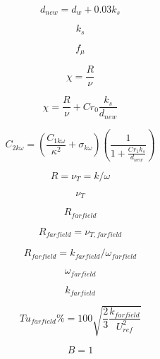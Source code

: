 \begin{equation}
d_{new}=d_{w}+0.03k_{s}
\end{equation}

\begin{equation}
k_s
\end{equation}

\begin{equation}
f_{\mu}
\end{equation}

\begin{equation}
\chi =\frac{R}{\nu }
\end{equation}

\begin{equation}
\chi =\frac{R}{\nu} +Cr_{0}\frac{k_{s}}{d_{new}}
\end{equation}

\begin{equation}
C_{2k\omega }=(\frac{C_{1k\omega }}{\kappa ^{2}}+\sigma _{k\omega })(\frac{1}{1+\frac{Cr_{1}k_{s}}{d_{new}}})
\end{equation}

\begin{equation}
R = \nu_T = k/\omega
\end{equation}

\begin{equation}
\nu_T
\end{equation}

\begin{equation}
R_{farfield}
\end{equation}

\begin{equation}
R_{farfield}=\nu_{T,farfield}
\end{equation}

\begin{equation}
R_{farfield}=k_{farfield}/\omega_{farfield}
\end{equation}

\begin{equation}
\omega_{farfield}
\end{equation}

\begin{equation}
k_{farfield}
\end{equation}

\begin{equation}
Tu_{farfield}\% = 100 \sqrt{\frac{2}{3} \frac{k_{farfield}}{U_{ref}^2}}
\end{equation}

\begin{equation}
B=1
\end{equation}


